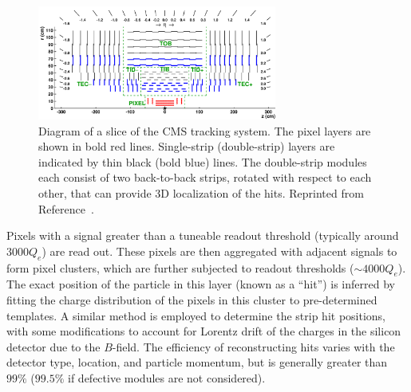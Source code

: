 \begin{figure}
    \begin{center} 
        \includegraphics[width=0.7\textwidth]{figures/cms/tracker.png}
        \caption{Diagram of a slice of the CMS tracking system.
                 The pixel layers are shown in bold red lines.
                 Single-strip (double-strip) layers are indicated by thin black (bold blue) lines.
                 The double-strip modules each consist of two back-to-back strips, rotated with respect to each other, that can provide 3D localization of the hits.
                 Reprinted from Reference~\cite{cmstracker}.}
        \label{fig:cms:si}
    \end{center}
\end{figure}

Pixels with a signal greater than a tuneable readout threshold (typically around $3000 Q_e$) are read out.
These pixels are then aggregated with adjacent signals to form pixel clusters, which are further subjected to readout thresholds ($\sim 4000 Q_e$).
The exact position of the particle in this layer (known as a ``hit'') is inferred by fitting the charge distribution of the pixels in this cluster to pre-determined templates.
A similar method is employed to determine the strip hit positions, with some modifications to account for Lorentz drift of the charges in the silicon detector due to the $B$-field. 
The efficiency of reconstructing hits varies with the detector type, location, and particle momentum, but is generally greater than $99\%$ ($99.5\%$ if defective modules are not considered). 

